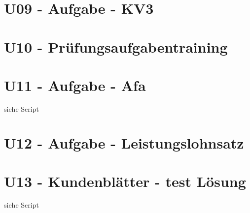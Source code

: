 \section{U09 - Aufgabe - KV3}\label{sec:U09-Aufgabe-KV3}



\section{U10 - Prüfungsaufgabentraining}\label{sec:U10-Pruefungsaufgabentraining}



\section{U11 - Aufgabe - Afa}

siehe Script

\section{U12 - Aufgabe - Leistungslohnsatz}\label{sec:U12-Aufgabe-Leistungslohnsatz}



\section{U13 - Kundenblätter - test Lösung}\label{sec:U13-Kundenblaetter-test-Loesung}
%

siehe Script







